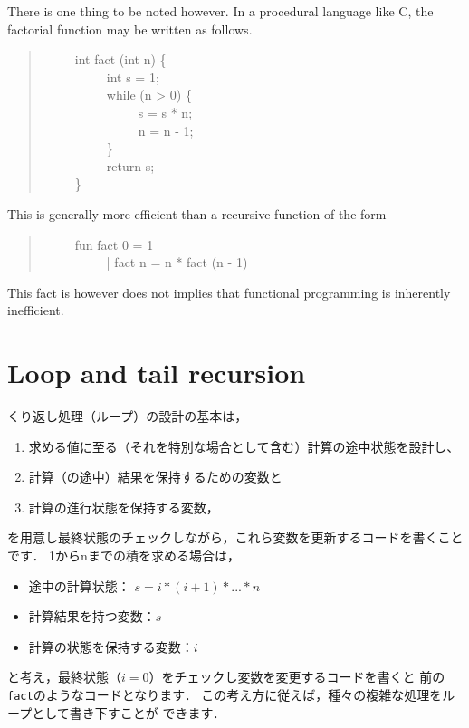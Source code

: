 \documentclass{jbook}
\newcommand{\txt}[2]{#2}
\newenvironment{program}{\begin{tt}\begin{quote}}{\end{quote}\end{tt}}
\newcommand{\myem}{\ \ \ \ \  }
\begin{document}
	There is one thing to be noted however.
	In a procedural language like C, the factorial function may be
written as follows.
\begin{program}
\myem int fact (int n) \{\\
\myem\myem   int s = 1;\\
\myem\myem   while (n > 0) \{\\
\myem\myem\myem     s = s * n;\\
\myem\myem\myem     n = n - 1;\\
\myem\myem   \}\\
\myem\myem  return s;\\
\myem \}
\end{program}
	This is generally more efficient than a recursive function of
the form
\begin{program}
\myem fun fact 0 = 1\\
\myem \ \ \ \ \ | fact n = n * fact (n - 1)
\end{program}
	This fact is however does not implies that functional
programming is inherently inefficient.
\fi%

\section{\txt{ループと末尾再帰関数}{Loop and tail recursion}}
\label{sec:tutorialTailcall}

\ifx\jp%
	くり返し処理（ループ）の設計の基本は，
\begin{enumerate}
\item 
求める値に至る（それを特別な場合として含む）計算の途中状態を設計し、
\item 
計算（の途中）結果を保持するための変数と
\item 
計算の進行状態を保持する変数，
\end{enumerate}
を用意し最終状態のチェックしながら，これら変数を更新するコードを書くこと
です．
	1からnまでの積を求める場合は，
\begin{itemize}
\item 
途中の計算状態：
$s = i * (i + 1) * ... * n$
\item 
計算結果を持つ変数：$s$
\item 
計算の状態を保持する変数：$i$
\end{itemize}
と考え，最終状態（$i = 0$）をチェックし変数を変更するコードを書くと
前の{\tt fact}のようなコードとなります．
	この考え方に従えば，種々の複雑な処理をループとして書き下すことが
できます．
\end{document}
